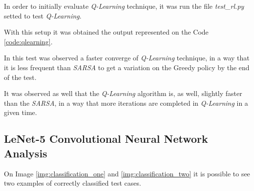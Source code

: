 \documentclass[journal]{IEEEtran}
\begin{document}
In order to initially evaluate \textit{Q-Learning} technique, it was run the file \textit{test\_rl.py} setted to test \textit{Q-Learning}.

With this setup it was obtained the output represented on the Code \ref{code:qlearning}.



In this test was observed a faster converge of \textit{Q-Learning} technique, in a way that it is less frequent than \textit{SARSA} to get a variation on the Greedy policy by the end of the test.

It was observed as well that the \textit{Q-Learning} algorithm is, as well, slightly faster than the \textit{SARSA}, in a way that more iterations are completed in \textit{Q-Learning} in a given time.

\subsection{LeNet-5 Convolutional Neural Network Analysis}

On Image \ref{img:classification_one} and \ref{img:classification_two} it is possible to see two examples of correctly classified test cases.

%

% 
\end{document}
